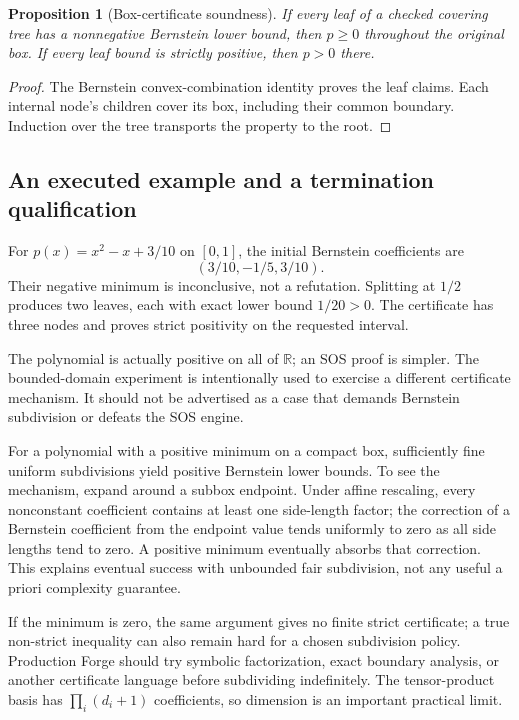 \documentclass[11pt,a4paper]{article}
\newcommand{\R}{\mathbb R}
\newtheorem{proposition}{Proposition}[section]
\begin{document}
\begin{proposition}[Box-certificate soundness]
If every leaf of a checked covering tree has a nonnegative Bernstein lower
bound, then $p\ge0$ throughout the original box. If every leaf bound is strictly
positive, then $p>0$ there.
\end{proposition}
\begin{proof}
The Bernstein convex-combination identity proves the leaf claims. Each internal
node's children cover its box, including their common boundary. Induction over
the tree transports the property to the root.
\end{proof}

\subsection{An executed example and a termination qualification}
For $p(x)=x^2-x+3/10$ on $[0,1]$, the initial Bernstein coefficients are
\[
 (3/10,-1/5,3/10).
\]
Their negative minimum is inconclusive, not a refutation. Splitting at $1/2$
produces two leaves, each with exact lower bound $1/20>0$. The certificate has
three nodes and proves strict positivity on the requested interval.

The polynomial is actually positive on all of $\R$; an SOS proof is simpler.
The bounded-domain experiment is intentionally used to exercise a different
certificate mechanism. It should not be advertised as a case that demands
Bernstein subdivision or defeats the SOS engine.

For a polynomial with a positive minimum on a compact box, sufficiently fine
uniform subdivisions yield positive Bernstein lower bounds. To see the
mechanism, expand around a subbox endpoint. Under affine rescaling, every
nonconstant coefficient contains at least one side-length factor; the
correction of a Bernstein coefficient from the endpoint value tends uniformly
to zero as all side lengths tend to zero. A positive minimum eventually
absorbs that correction. This explains eventual success with unbounded fair
subdivision, not any useful a priori complexity guarantee.

If the minimum is zero, the same argument gives no finite strict certificate;
a true non-strict inequality can also remain hard for a chosen subdivision
policy. Production Forge should try symbolic factorization, exact boundary
analysis, or another certificate language before subdividing indefinitely.
The tensor-product basis has $\prod_i(d_i+1)$ coefficients, so dimension is
an important practical limit.
\end{document}
